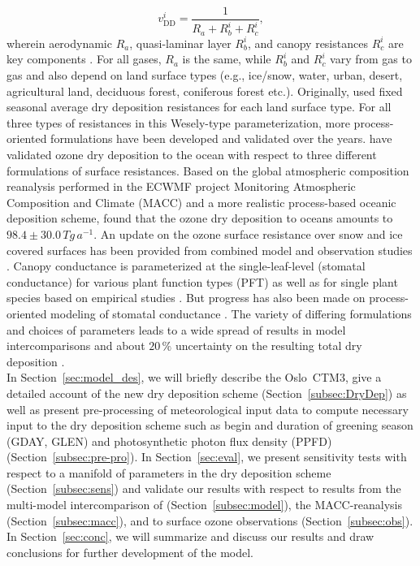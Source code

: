 \documentclass[gmd, manuscript]{copernicus}
\begin{document}
\begin{equation}
  v^i_\text{DD} = \frac{1}{R_a + R^i_b + R^i_c},
  \label{eq:drydep_velo}
\end{equation}
wherein aerodynamic $R_a$, quasi-laminar layer $R^i_b$, and canopy resistances $R^i_c$ are key components \citep{AE:Wesely1989,ACP:Seinfeld2006}. For all gases, $R_a$ is the same, while $R^i_b$ and $R^i_c$ vary from gas to gas and also depend on land surface types (e.g., ice/snow, water, urban, desert, agricultural land, deciduous forest, coniferous forest etc.). Originally, \citet{AE:Wesely1989} used fixed seasonal average dry deposition resistances for each land surface type. For all three types of resistances in this Wesely-type parameterization, more process-oriented formulations have been developed and validated over the years. \citet{ACP:Luhar2017} have validated ozone dry deposition to the ocean with respect to three different formulations of surface resistances.
Based on the global atmospheric composition reanalysis performed in the ECWMF project Monitoring Atmospheric Composition and Climate (MACC) \citep{MACC-II} and a more realistic process-based oceanic deposition scheme, \citet{ACP:Luhar2018} found that the ozone dry deposition to oceans amounts to $98.4 \pm 30.0\,\unit{Tg\,a^{-1}}$.
An update on the ozone surface resistance over snow and ice covered surfaces has been provided from combined model and observation studies \citep[][$v^\chem{O_3}_\text{ice/snow} = 1/10000\,\unit{m\,s^{-1}}$]{ACP:Helmig2007}. Canopy conductance is parameterized at the single-leaf-level (stomatal conductance) for various plant function types (PFT) as well as for single plant species based on empirical studies \citep{PTRS:Jarvis1976, BallBerry1987, ACP:Simpson2012, ICP:MappingManual2017}. But progress has also been made on process-oriented modeling of stomatal conductance \citep{AFM:Anderson2000,PP:Buckley2017}. The variety of differing formulations and choices of parameters leads to a wide spread of results in model intercomparisons \citep{ACP:Hardacre2015,AE:Derwent2018} and about $20\,\unit{\%}$ uncertainty on the resulting total dry deposition \citep{ACP:Monks2015}.\\

In Section~\ref{sec:model_des}, we will briefly describe the Oslo~CTM3, give a detailed account of the new dry deposition scheme (Section~\ref{subsec:DryDep}) as well as present pre-processing of meteorological input data to compute necessary input to the dry deposition scheme such as begin and duration of greening season (GDAY, GLEN) and photosynthetic photon flux density (PPFD) (Section~\ref{subsec:pre-pro}). In Section~\ref{sec:eval}, we present sensitivity tests with respect to a manifold of parameters in the dry deposition scheme (Section~\ref{subsec:sens}) and validate our results with respect to results from the multi-model intercomparison of \citet{ACP:Hardacre2015} (Section~\ref{subsec:model}), the MACC-reanalysis (Section~\ref{subsec:macc}), and to surface ozone observations (Section~\ref{subsec:obs}). In Section~\ref{sec:conc}, we will summarize and discuss our results and draw conclusions for further development of the model.
\end{document}

